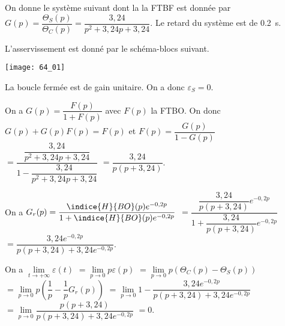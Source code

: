 \normaltrue \difficilefalse \tdifficilefalse
\correctiontrue

\setcounter{question}{0}%

\ifcorrection
{}
\else
{}
\fi


\ifprof
\else
On donne le système suivant dont la la FTBF est donnée par 
$G(p)=\dfrac{\Theta_S(p)}{\Theta_C(p)}=\dfrac{3,24}{p^2+3,24 p+3,24}$. Le retard du système est de \SI{0,2}{s}.

L'asservissement est donné par le schéma-blocs suivant.

\begin{marginfigure}
\texttt{[image: 64\_01]}
\end{marginfigure}

\fi

 
\ifprof

La boucle fermée est de gain unitaire. On a donc $\varepsilon_S = 0$.
\else 
\fi

\ifprof

On a $G(p)=\dfrac{F(p)}{1+F(p)}$ avec $F(p)$ la FTBO. On donc $G(p)+G(p)F(p)=F(p)$ et
 $F(p)=\dfrac{G(p)}{1-G(p)} $
 $ = \dfrac{\dfrac{3,24}{p^2+3,24 p+3,24}}{1-\dfrac{3,24}{p^2+3,24 p+3,24}} $
  $ = \dfrac{3,24}{p\left(p+3,24\right)} $. 

\else 
\fi
 
\ifprof

On a $G_r(p)=\dfrac{\indice{H}{BO}(p)e^{-0,2 p}}{1+\indice{H}{BO}(p)e^{-0,2 p}}$ 
$=\dfrac{\dfrac{3,24}{p\left(p+3,24\right)}e^{-0,2 p}}{1+\dfrac{3,24}{p\left(p+3,24\right)}e^{-0,2 p}}$
$=\dfrac{3,24e^{-0,2 p}}{p\left(p+3,24\right)+3,24e^{-0,2 p}}$.
\else 
\fi


 
\ifprof

On a $\lim\limits_{t\to +\infty} \varepsilon(t) $
$= \lim\limits_{p\to 0} p\varepsilon(p) $
$= \lim\limits_{p\to 0} p\left( \Theta_C(p) - \Theta_S(p) \right) $
$= \lim\limits_{p\to 0} p\left( \dfrac{1}{p}-\dfrac{1}{p} G_r(p) \right) $
$= \lim\limits_{p\to 0}  1-\dfrac{3,24e^{-0,2 p}}{p\left(p+3,24\right)+3,24e^{-0,2 p}} $
$= \lim\limits_{p\to 0}  \dfrac{p\left(p+3,24\right)}{p\left(p+3,24\right)+3,24e^{-0,2 p}} $ $=0$.

